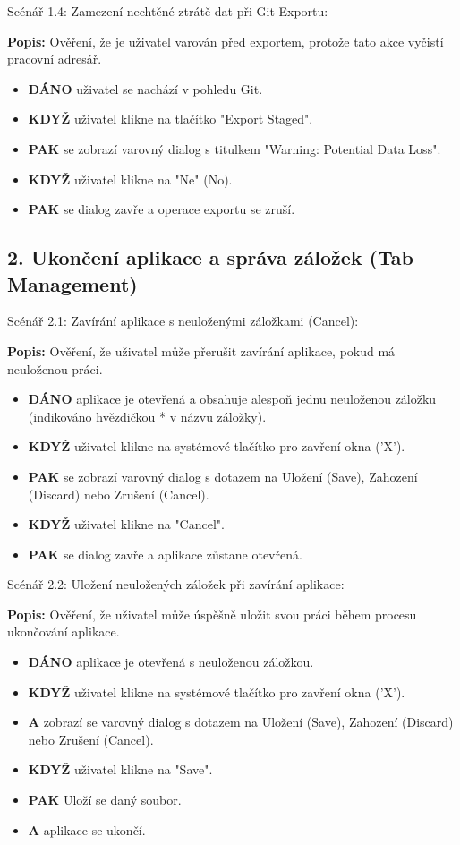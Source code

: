 \documentclass[12pt, a4paper]{article}
\begin{document}
Scénář 1.4: Zamezení nechtěné ztrátě dat při Git Exportu:

\textbf{Popis:} Ověření, že je uživatel varován před exportem, protože tato akce vyčistí pracovní adresář.
\begin{itemize}
    \item \textbf{DÁNO} uživatel se nachází v pohledu Git.
    \item \textbf{KDYŽ} uživatel klikne na tlačítko "Export Staged".
    \item \textbf{PAK} se zobrazí varovný dialog s titulkem "Warning: Potential Data Loss".
    \item \textbf{KDYŽ} uživatel klikne na "Ne" (No).
    \item \textbf{PAK} se dialog zavře a operace exportu se zruší.
\end{itemize}

\subsection*{2. Ukončení aplikace a správa záložek (Tab Management)}

Scénář 2.1: Zavírání aplikace s neuloženými záložkami (Cancel):

\textbf{Popis:} Ověření, že uživatel může přerušit zavírání aplikace, pokud má neuloženou práci.
\begin{itemize}
    \item \textbf{DÁNO} aplikace je otevřená a obsahuje alespoň jednu neuloženou záložku (indikováno hvězdičkou * v názvu záložky).
    \item \textbf{KDYŽ} uživatel klikne na systémové tlačítko pro zavření okna ('X').
    \item \textbf{PAK} se zobrazí varovný dialog s dotazem na Uložení (Save), Zahození (Discard) nebo Zrušení (Cancel).
    \item \textbf{KDYŽ} uživatel klikne na "Cancel".
    \item \textbf{PAK} se dialog zavře a aplikace zůstane otevřená.
\end{itemize}

Scénář 2.2: Uložení neuložených záložek při zavírání aplikace:

\textbf{Popis:} Ověření, že uživatel může úspěšně uložit svou práci během procesu ukončování aplikace.
\begin{itemize}
    \item \textbf{DÁNO} aplikace je otevřená s neuloženou záložkou.
    \item \textbf{KDYŽ} uživatel klikne na systémové tlačítko pro zavření okna ('X').
    \item \textbf{A} zobrazí se varovný dialog s dotazem na Uložení (Save), Zahození (Discard) nebo Zrušení (Cancel).
    \item \textbf{KDYŽ} uživatel klikne na "Save".
    \item \textbf{PAK} Uloží se daný soubor.
    \item \textbf{A} aplikace se ukončí.
\end{itemize}
\end{document}
